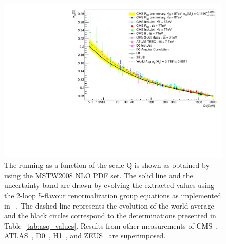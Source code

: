 %

\begin{figure}[tbp]
 \hspace*{-4mm}\includegraphics[width=1.05\textwidth]{Plots_HT_2_150/Running_alphas_8TeV_R32.pdf}\hftwo
  \caption{The running \alpsq as a function of the scale Q is shown as
    obtained by using the MSTW2008 NLO PDF set. The solid line and the
    uncertainty band are drawn by evolving the extracted \alpsmz
    values using the 2-loop 5-flavour renormalization group equations
    as implemented in \RunDec~\cite{Chetyrkin:2000yt,Schmidt:2012az}.
    The dashed line represents the evolution of the world
    average~\cite{Patrignani:2016xqp} and the black circles correspond
    to the \alpsq determinations presented in
    Table~\ref{tab:asq_values}. Results from other measurements of
    CMS~\cite{Chatrchyan:2013txa, Chatrchyan:2013haa,
      Khachatryan:2014waa, CMS:2014mna, Khachatryan:2016mlc},
    ATLAS~\cite{ATLAS:2015yaa}, D0~\cite{Abazov:2009nc,
      Abazov:2012lua}, H1~\cite{Andreev:2014wwa, Andreev:2016tgi}, and
    ZEUS~\cite{Abramowicz:2012jz} are superimposed.}
  \label{fig:running_alphas}
\end{figure}
